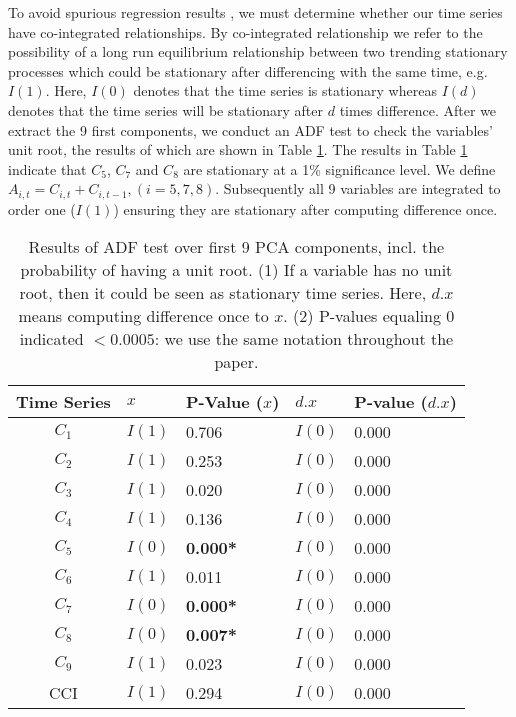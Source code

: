 \documentclass[10pt]{article}
\begin{document}
To avoid spurious regression results \cite{Yule1926,Granger1974}, we must determine whether our time series have co-integrated relationships. By co-integrated relationship we refer to the possibility of a long run equilibrium relationship between two trending stationary processes which could be stationary after differencing with the same time, e.g.~$I(1)$.
Here, $I(0)$ denotes that the time series is stationary whereas $I(d)$ denotes that the time series will be stationary after $d$ times difference.   
After we extract the 9 first components, we conduct an ADF test \cite{Dickey1979,Fuller1976} to check the variables' unit root, the results of which are shown in Table \ref{ADF test}. 
The results in Table \ref{ADF test} indicate that $C_5$, $C_7$ and $C_8$ are stationary at a 1\% significance level. We define $A_{i,t}= C_{i,t}+ C_{i,t-1}, (i=5, 7, 8)$.
Subsequently all 9 variables are integrated to order one ($I(1)$) ensuring they are stationary after computing difference once. 

\begin{table}
	\begin{center}
	\begin{tabular}{cp{1.5cm}lp{1.5cm}l}
	\hline
      	Time Series	&	$x$	        &	P-Value ($x$)  &       $d.x$         & P-value ($d.x$) \\   
		 \hline
	$C_1$	&	         $I(1)$	&	0.706               &        $I(0)$	&	0.000                     \\
	$C_2$	&		$I(1)$	&	0.253               &        $I(0)$	&	0.000                     \\  
	$C_3$	&		$I(1)$	&	0.020               &        $I(0)$	&	0.000                     \\  
	$C_4$	&		$I(1)$	&	0.136               &        $I(0)$	&	0.000                     \\  
	$C_5$	&	 	$I(0)$	&	\textbf{0.000*}  &        $I(0)$ 	&	0.000                     \\ 
	$C_6$	&	  	$I(1)$	&	0.011                &        $I(0)$ 	&	0.000                     \\
	$C_7$	&		$I(0)$	&	\textbf{0.000* } &        $I(0)$ 	&	0.000                     \\
	$C_8$	&	  	$I(0)$	&	\textbf{0.007* } &        $I(0)$	&	0.000                     \\ 
	$C_9$	&		$I(1)$	&	0.023                &        $I(0)$ 	&	0.000                     \\
	  CCI        &		$I(1)$	&	0.294                &        $I(0)$	&	0.000                     \\ 
	\hline

	\end{tabular}
	\caption{\label{ADF test} Results of ADF test over first 9 PCA components, incl. the probability of having a unit root. (1)  If a variable has no unit root, then it could be seen as stationary time series. Here, $d.x$ means computing difference once to $x$. (2) P-values equaling 0 indicated $<0.0005$: we use the same notation throughout the paper.}
\end{center}

\end{table}
\end{document}
